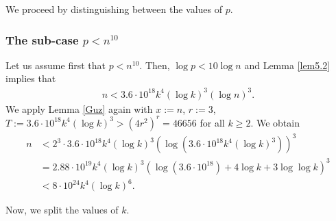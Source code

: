 \documentclass[11pt,a4paper]{article}
\numberwithin{equation}{section}
\numberwithin{table}{section}
\numberwithin{figure}{section}
\begin{document}
We proceed by distinguishing between the values of $p$.

\subsubsection{The sub-case $p < n^{10}$}
Let us assume first that $p < n^{10}$. Then, $\log p < 10\log n$ and Lemma \ref{lem5.2} implies that 
\begin{align*}
	n < 3.6\cdot 10^{18} k^{4}(\log k)^3 (\log n)^3 .
\end{align*}
We apply Lemma \ref{Guz} again with  $x:=n$, $r:=3$, $T:=3.6\cdot 10^{18} k^{4}(\log k)^3 >(4r^2)^r=46656$ for all $k\ge 2$. We obtain 
\begin{align}\label{eq:nk}
	n&<2^3\cdot 3.6\cdot 10^{18} k^{4}(\log k)^3\left(\log (3.6\cdot 10^{18} k^{4}(\log k)^3)\right)^3\nonumber\\
	&=2.88\cdot 10^{19} k^{4}(\log k)^3 \left(\log (3.6\cdot 10^{18})+4\log k+3\log\log k\right)^3\nonumber\\
	&<8\cdot 10^{24} k^{4}(\log k)^6 .
\end{align}

Now, we split the values of $k$.

\medskip
\end{document}
